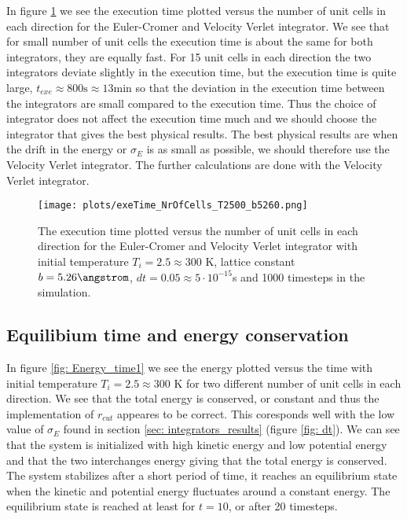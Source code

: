 \documentclass[11pt,a4wide]{article}
\begin{document}
In figure \ref{fig: exe_cells} we see the execution time plotted versus the number of unit cells in each direction for the Euler-Cromer and Velocity Verlet integrator. We see that for small number of unit cells the execution time is about the same for both integrators, they are equally fast. For 15 unit cells in each direction the two integrators deviate slightly in the execution time, but the execution time is quite large, $t_{exe} \approx 800 \mathrm{s} \approx 13 \mathrm{min}$ so that the deviation in the execution time between the integrators are small compared to the execution time. Thus the choice of integrator does not affect the execution time much and we should choose the integrator that gives the best physical results. The best physical results are when the drift in the energy or $\sigma_E$ is as small as possible, we should therefore use the Velocity Verlet integrator. The further calculations are done with the Velocity Verlet integrator. 

\begin{figure}[htp]
\centering
\texttt{[image: plots/exeTime\_NrOfCells\_T2500\_b5260.png]}
\caption{The execution time plotted versus the number of unit cells in each direction for the Euler-Cromer and Velocity Verlet integrator with initial temperature $T_i = 2.5 \approx 300$ K, lattice constant $b=5.26 \angstrom$, $dt=0.05\approx  5\cdot 10^{-15}$s and 1000 timesteps in the simulation.}
\label{fig: exe_cells}
\end{figure}

\subsection{Equilibium time and energy conservation}
In figure \ref{fig: Energy_time1} we see the energy plotted versus the time with initial temperature $T_i = 2.5 \approx 300$ K for two different number of unit cells in each direction. We see that the total energy is conserved, or constant and thus the implementation of $r_{cut}$ appeares to be correct. This coresponds well with the low value of $\sigma_E$ found in section \ref{sec: integrators_results} (figure \ref{fig: dt}). We can see that the system is initialized with high kinetic energy and low potential energy and that the two interchanges energy giving that the total energy is conserved. The system stabilizes after a short period of time, it reaches an equilibrium state when the kinetic and potential energy fluctuates around a constant energy. The equilibrium state is reached at least for $t=10$, or after 20 timesteps. 
\end{document}
